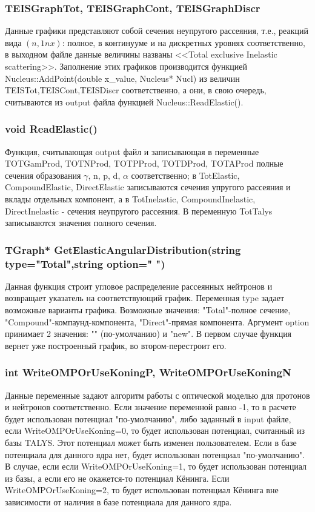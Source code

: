 \documentclass[a4paper,12pt]{extarticle}
\begin{document}
\subsubsection{TEISGraphTot, TEISGraphCont, TEISGraphDiscr}
Данные графики представляют собой сечения неупругого рассеяния, т.е., реакций вида $(n,1nx)$: полное, в континууме и на дискретных уровнях соответственно, в выходном файле данные величины названы <<Total exclusive Inelastic scattering>>. Заполнение этих графиков производится функцией Nucleus::AddPoint(double x_value, Nucleus* Nucl) из величин TEISTot,TEISCont,TEISDiscr соответственно, а они, в свою очередь, считываются из output файла функцией Nucleus::ReadElastic().
\subsubsection{void ReadElastic()}
Функция, считывающая output файл и записывающая в переменные TOTGamProd, TOTNProd, TOTPProd, TOTDProd, TOTAProd полные сечения образования $\gamma$, n, p, d, $\alpha$ соответственно;  в TotElastic, CompoundElastic, DirectElastic записываются сечения упругого рассеяния и вклады отдельных компонент, а в TotInelastic, CompoundInelastic, DirectInelastic - сечения неупругого рассеяния. В переменную TotTalys записываются значения полного сечения.
\subsubsection{TGraph* GetElasticAngularDistribution(string type="Total",string option=" ")}
Данная функция строит угловое распределение рассеянных нейтронов и возвращает указатель на соответствующий график. Переменная type задает возможные варианты графика. Возможные значения: "Total"-полное сечение, "Compound"-компаунд-компонента, "Direct"-прямая компонента. Аргумент option принимает 2 значения: "" (по-умолчанию) и "new". В первом случае функция вернет уже построенный график, во втором-перестроит его.
\subsubsection{int WriteOMPOrUseKoningP, WriteOMPOrUseKoningN}
Данные переменные задают алгоритм работы с оптической моделью для протонов и нейтронов соответственно. Если значение переменной равно -1, то в расчете будет использован потенциал "по-умолчанию", либо заданный в input файле, если WriteOMPOrUseKoning=0, то будет использован потенциал, считанный из базы TALYS. Этот потенциал может быть изменен пользователем. Если в базе потенциала для данного ядра нет, будет использован потенциал "по-умолчанию". В случае, если если WriteOMPOrUseKoning=1, то будет использован потенциал из базы, а если его не окажется-то потенциал Кёнинга. Если WriteOMPOrUseKoning=2, то будет использован потенциал Кёнинга вне зависимости от наличия в базе потенциала для данного ядра.
\end{document}

